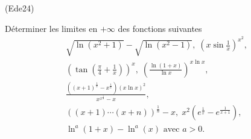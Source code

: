 \begin{tiny}(Ede24)\end{tiny}  
D{\'e}terminer les limites en $+\infty$ des fonctions suivantes 
\begin{multline*}
\sqrt{\ln (x^{2}+1)}-\sqrt{\ln (x^{2}-1)}, \;
\left( x\sin \frac{1}{x}\right) ^{x^{2}},  \\
\left( \tan \left( \frac{\pi }{4}+\frac{1}{x}\right) \right) ^{x}, \;
\left( \frac{\ln (1+x)}{\ln x}\right) ^{x\ln x}, \\
\frac{\left((x+1)^{\frac{1}{x}}-x^{\frac{1}{x}}\right) \left( x\ln x\right) ^{2}}{x^{x^{\frac{1}{x}}}-x},  \\
\left( (x+1)\cdots(x+n)\right)^{\frac{1}{n}}-x, \;
x^2\left( e^{\frac{1}{x}} - e^{\frac{1}{x+1}}\right) , \; \\
\ln^a(1+x) - \ln^a(x) \text{ avec } a>0.
\end{multline*}
